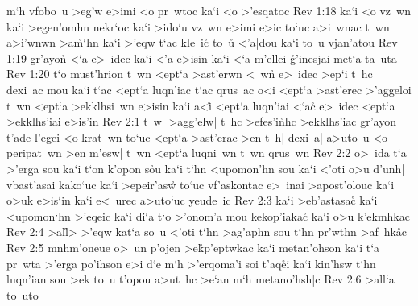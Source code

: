 m`h
vfobo~u
>eg'w
e>imi
<o
pr~wtoc
ka`i
<o
>'esqatoc\bibvsend
\vs Rev 1:18
ka`i
<o
vz~wn
ka`i
>egen'omhn
nekr`oc
ka`i
>ido`u
vz~wn
e>imi
e>ic
to`uc
a>i~wnac
t~wn
a>i'wnwn
>a\r{m}`hn
ka`i
>'eqw
t`ac
kle~i\r{c}
to~u\r{}
<'a|dou
ka`i
to~u
vjan'atou\bibvsend
\vs Rev 1:19
gr'ayo\r{n}
<`a
e>~idec
ka`i
<'a
e>isin
ka`i
<`a
m'ellei
\r{g}'inesjai
met`a
ta~uta\bibvsend
\vs Rev 1:20
t`o
must'hrion
t~wn
<ept`a
>ast'erwn
<~w\r{n}
e>~idec
>ep`i
t~hc
dexi~ac
mou
ka`i
t`ac
<ept`a
luqn'iac
t`ac
qrus~ac
o<i
<ept`a
>ast'erec
>'aggeloi
t~wn
<ept`a
>ekklhsi~wn
e>isin
ka`i
a<i\r{}
<ept`a
luqn'iai
<`ac\r{}
e>~idec
<ept`a
>ekklhs'iai
e>is'in\bibvsend
\vs Rev 2:1
t~w|
>agg'elw|
t~hc
>efes'i\r{n}hc
>ekklhs'iac
gr'ayon
t'ade
l'egei
<o
krat~wn
to`uc
<ept`a
>ast'erac
>en
t~h|
dexi~a|
a>uto~u
<o
peripat~wn
>en
m'esw|
t~wn
<ept`a
luqni~wn
t~wn
qrus~wn\bibvsend
\vs Rev 2:2
o>~ida
t`a
>'erga
sou
ka`i
t`on
k'opon
s\r{o}u
ka`i
t`hn
<upomon'hn
sou
ka`i
<'oti
o>u
d'unh|
vbast'asai
kako`uc
ka`i
>epeir'asw\r{}
to`uc
vf'askontac
e>~inai
>apost'olouc
ka`i
o>uk
e>is`in
ka`i
e<~urec
a>uto`uc
yeude~ic\bibvsend
\vs Rev 2:3
ka`i
>eb'astasac\r{}
ka`i
<upomon`hn
>'eqeic
ka`i
di`a
t`o
>'onom'a
mou
kekop'iakac\r{}
ka`i
o>u
k'ekmhkac\bibvsend
\vs Rev 2:4
>al\r{l}>
>'eqw
kat`a
so~u
<'oti
t`hn
>ag'aphn
sou
t`hn
pr'wthn
>af~hk\r{a}c\bibvsend
{}
\vs Rev 2:5
mnhm'oneue
o>~un
p'ojen
>e\r{k}p'eptwkac
ka`i
metan'ohson
ka`i
t`a
pr~wta
>'erga
po'ihson
e>i
d`e
m`h
>'erqoma'i
soi
t'aq\r{e}i
ka`i
kin'hsw
t`hn
luqn'ian
sou
>ek
to~u
t'opou
a>ut~hc
>e`an
m`h
metano'hsh|c\bibvsend
\vs Rev 2:6
>all`a
to~uto
